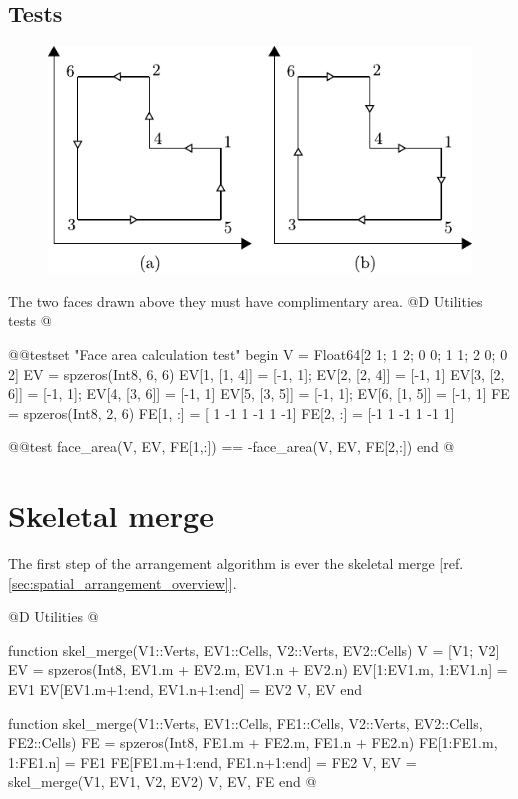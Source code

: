 \subsection{Tests}
\begin{figure}[h]
    \centering
    \includegraphics{./img/ch5-area_test.pdf}
\end{figure}
\noindent The two faces drawn above they must have complimentary area.
@D Utilities tests
@{@@testset "Face area calculation test" begin
    V = Float64[2 1; 1 2; 0 0; 1 1; 2 0; 0 2]
    EV = spzeros(Int8, 6, 6)
    EV[1, [1, 4]] = [-1, 1]; EV[2, [2, 4]] = [-1, 1]
    EV[3, [2, 6]] = [-1, 1]; EV[4, [3, 6]] = [-1, 1]
    EV[5, [3, 5]] = [-1, 1]; EV[6, [1, 5]] = [-1, 1]
    FE = spzeros(Int8, 2, 6)
    FE[1, :] = [ 1 -1  1 -1  1 -1]
    FE[2, :] = [-1  1 -1  1 -1  1]

    @@test face_area(V, EV, FE[1,:]) == -face_area(V, EV, FE[2,:])
end
@}

\section{Skeletal merge}
\label{sec:skel_merge}

The first step of the arrangement algorithm is ever
the skeletal merge [ref. \ref{sec:spatial_arrangement_overview}].

@D Utilities
@{function skel_merge(V1::Verts, EV1::Cells, V2::Verts, EV2::Cells)
    V = [V1; V2]
    EV = spzeros(Int8, EV1.m + EV2.m, EV1.n + EV2.n)
    EV[1:EV1.m, 1:EV1.n] = EV1
    EV[EV1.m+1:end, EV1.n+1:end] = EV2
    V, EV
end

function skel_merge(V1::Verts, EV1::Cells, FE1::Cells, V2::Verts, EV2::Cells, FE2::Cells)
    FE = spzeros(Int8, FE1.m + FE2.m, FE1.n + FE2.n)
    FE[1:FE1.m, 1:FE1.n] = FE1
    FE[FE1.m+1:end, FE1.n+1:end] = FE2
    V, EV = skel_merge(V1, EV1, V2, EV2)
    V, EV, FE
end
@}

